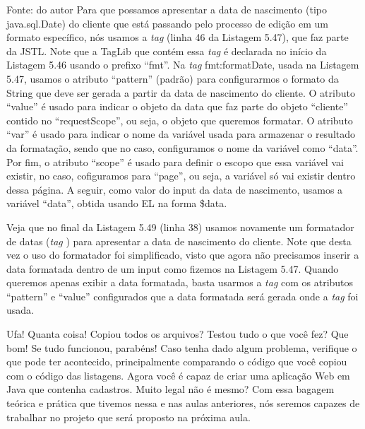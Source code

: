 Fonte: do autor
Para que possamos apresentar a data de nascimento (tipo java.sql.Date) do cliente que está passando pelo processo de edição em um formato específico, nós usamos a \textit{tag}  (linha 46 da Listagem 5.47), que faz parte da JSTL. Note que a TagLib que contém essa \textit{tag} é declarada no início da Listagem 5.46 usando o prefixo ``fmt''. Na \textit{tag} fmt:formatDate, usada na Listagem 5.47, usamos o atributo ``pattern'' (padrão) para configurarmos o formato da String que deve ser gerada a partir da data de nascimento do cliente. O atributo ``value'' é usado para indicar o objeto da data que faz parte do objeto ``cliente'' contido no ``requestScope'', ou seja, o objeto que queremos formatar. O atributo ``var'' é usado para indicar o nome da variável usada para armazenar o resultado da formatação, sendo que no caso, configuramos o nome da variável como ``data''. Por fim, o atributo ``scope'' é usado para definir o escopo que essa variável vai existir, no caso, cofiguramos para ``page'', ou seja, a variável só vai existir dentro dessa página. A seguir, como valor do input da data de nascimento, usamos a variável ``data'', obtida usando EL na forma \${data}.


Veja que no final da Listagem 5.49 (linha 38) usamos novamente um formatador de datas (\textit{tag} ) para apresentar a data de nascimento do cliente. Note que desta vez o uso do formatador foi simplificado, visto que agora não precisamos inserir a data formatada dentro de um input como fizemos na Listagem 5.47. Quando queremos apenas exibir a data formatada, basta usarmos a \textit{tag}  com os atributos ``pattern'' e ``value'' configurados que a data formatada será gerada onde a \textit{tag} foi usada.

Ufa! Quanta coisa! Copiou todos os arquivos? Testou tudo o que você fez? Que bom! Se tudo funcionou, parabéns! Caso tenha dado algum problema, verifique o que pode ter acontecido, principalmente comparando o código que você copiou com o código das listagens. Agora você é capaz de criar uma aplicação Web em Java que contenha cadastros. Muito legal não é mesmo? Com essa bagagem teórica e prática que tivemos nessa e nas aulas anteriores, nós seremos capazes de trabalhar no projeto que será proposto na próxima aula.

